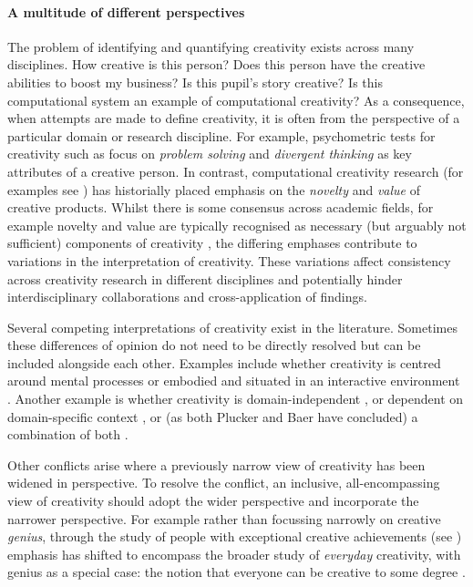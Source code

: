 \documentclass[10pt,letterpaper]{article}
\begin{document}
\paragraph{A multitude of different perspectives} \label{perspectives}

The problem of identifying and quantifying creativity exists across many disciplines. How creative is this person? Does this person have the creative abilities to boost my business? Is this pupil's story creative? Is this computational system an example of computational creativity? As a consequence, when attempts are made to define creativity, it is often from the perspective of a particular domain or research discipline. For example, psychometric tests for creativity such as \cite{guilford50,torrance74} focus on {\em problem solving} and {\em divergent thinking} as key attributes of a creative person. In contrast, computational creativity research (for examples see \cite{pease01,wiggins06ngc,peinado06ngc,ritchie07}) has historially placed emphasis on the {\em novelty} and {\em value} of creative products. Whilst there is some consensus across academic fields, for example novelty and value are typically recognised as necessary (but arguably not sufficient) components of creativity \cite{mayer99}, the differing emphases contribute to variations in the interpretation of creativity. These variations affect consistency across creativity research in different disciplines and potentially hinder interdisciplinary collaborations and cross-application of findings.

Several competing interpretations of creativity exist in the literature. Sometimes these differences of opinion do not need to be directly resolved but can be included alongside each other. Examples include whether creativity is centred around mental processes \cite{boden04,dietrich10,gabora12} or embodied and situated in an interactive environment \cite{mccormack07,sosa09}. Another example is whether creativity is domain-independent \cite{plucker98}, or dependent on domain-specific context \cite{baer98}, or (as both Plucker and Baer have concluded) a combination of both \cite{plucker04,baer10}. 

Other conflicts arise where a previously narrow view of creativity has been widened in perspective. To resolve the conflict, an inclusive, all-encompassing view of creativity should adopt the wider perspective and incorporate the narrower perspective. For example rather than focussing narrowly on creative {\em genius}, through the study of people with exceptional creative achievements (see \cite{poincare29,hadamard45}) emphasis has shifted to encompass the broader study of {\em everyday} creativity, with genius as a special case: the notion that everyone can be creative to some degree \cite{weisberg88,bryankinns09}.
\end{document}
